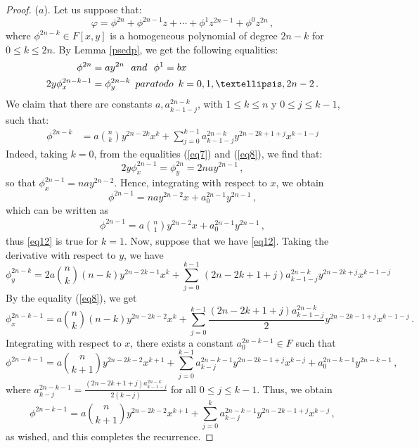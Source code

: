 \documentclass[10pt,a4paper]{amsart}
\begin{document}
\begin{proof}
	($a$). Let us suppose that:
	\begin{equation}\label{eqh}
		\varphi=\phi^{2n}+\phi^{2n-1}z+\cdots+\phi^{1}z^{2n-1}+\phi^0z^{2n}\,,
	\end{equation}
	where $\phi^{2n-k}\in F[x,y]$ is a homogeneous polynomial of degree $2n-k$ for  $0\leq k\leq 2n$. By Lemma \ref{psedp}, we get the following equalities: 
	\begin{align}	
		\phi^{2n}&=ay^{2n}\label{eq7}\,\,\,\, \textnormal{and}\,\,\,\, \phi^{1}=bx\\
		2y\phi^{2n-k-1}_x&=\phi^{2n-k}_y\,\,\, \textnormal{para todo}\,\,\, k=0,1,\dots, 2n-2\,.\label{eq8}
	\end{align}
	We claim that there are constants $a, a^{2n-k}_{k-1-j}$, with  $1\leq k\leq n$ y $0\leq j\leq k-1$, such that:
	\begin{align}
		\phi^{2n-k}&=a\binom{n}{k}y^{2n-2k}x^k+\sum_{j=0}^{k-1} a^{2n-k}_{k-1-j}y^{2n-2k+1+j}x^{k-1-j}\label{eq12}
	\end{align}
	Indeed, taking $k=0$, from the equalities (\ref{eq7}) and  (\ref{eq8}), we find that:
	\begin{equation*}
		2y\phi^{2n-1}_x=\phi^{2n}_y=2nay^{2n-1}\,,
	\end{equation*}
	so that $\phi_x^{2n-1}=nay^{2n-2}$. Hence, integrating with respect to $x$, we obtain
	$$\phi^{2n-1}=nay^{2n-2}x+a^{2n-1}_0y^{2n-1}\,,$$ which can be written as 
	\begin{align*}
		\phi^{2n-1}=a\binom{n}{1}y^{2n-2}x+a^{2n-1}_{0}y^{2n-1}\,,
	\end{align*}
	thus \eqref{eq12} is true for $k=1$. Now, suppose that we have \eqref{eq12}. 
	Taking the derivative with respect to $y$, we have
	$$\phi^{2n-k}_y=2a\binom{n}{k}(n-k)y^{2n-2k-1}x^k+\sum_{j=0}^{k-1}\, (2n-2k+1+j)a^{2n-k}_{k-1-j}y^{2n-2k+j}x^{k-1-j}$$
	By the equality (\ref{eq8}), we get 
	$$\phi^{2n-k-1}_x=a\binom{n}{k}(n-k)y^{2n-2k-2}x^k+\sum_{j=0}^{k-1} \frac{(2n-2k+1+j)a^{2n-k}_{k-1-j}}{2}y^{2n-2k-1+j}x^{k-1-j}\,.$$
	Integrating with respect to $x$, there exists a constant $a^{2n-k-1}_{0}\in F$ such that
	$$\phi^{2n-k-1}=a\binom{n}{k+1}y^{2n-2k-2}x^{k+1}+\sum_{j=0}^{k-1} a^{2n-k-1}_{k-j}y^{2n-2k-1+j}x^{k-j}+a^{2n-k-1}_{0}y^{2n-k-1}\,,$$
	where $\displaystyle a^{2n-k-1}_{k-j}= \frac{(2n-2k+1+j)a^{2n-k}_{k-1-j}}{2(k-j)}$ for all $0\leq j\leq k-1$. Thus, we obtain
	$$\phi^{2n-k-1}=a\binom{n}{k+1}y^{2n-2k-2}x^{k+1}+\sum_{j=0}^{k}a^{2n-k-1}_{k-j}y^{2n-2k-1+j}x^{k-j}\,,$$
	as wished, and this completes the recurrence.
	

\end{proof}
\end{document}
